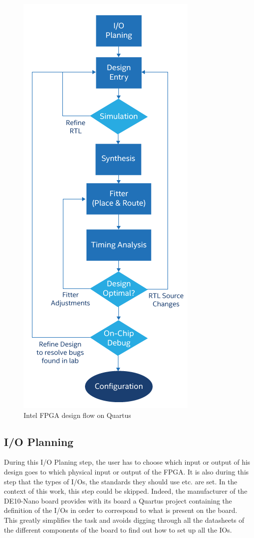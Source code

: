 \begin{figure}[ht]
    \centering
    \includegraphics[scale=0.5]{Chapter2-FPGA_Flow/res/blockdiagram-quartus-flow.png}
    \caption{Intel FPGA design flow on Quartus}
    \label{fig:flow/design_flow}
\end{figure}

\subsection{I/O Planning}

During this I/O Planing step, the user has to choose which input or output of his design goes to 
which physical input or output of the FPGA. It is also during this step that the types of I/Os, the 
standards they should use etc. are set. In the context of this work, this step could be skipped. 
Indeed, the manufacturer of the DE10-Nano board provides with its board a Quartus project 
containing the definition of the I/Os in order to correspond to what is present on the board. 
This greatly simplifies the task and avoids digging through all the datasheets of the different
components of the board to find out how to set up all the IOs.

